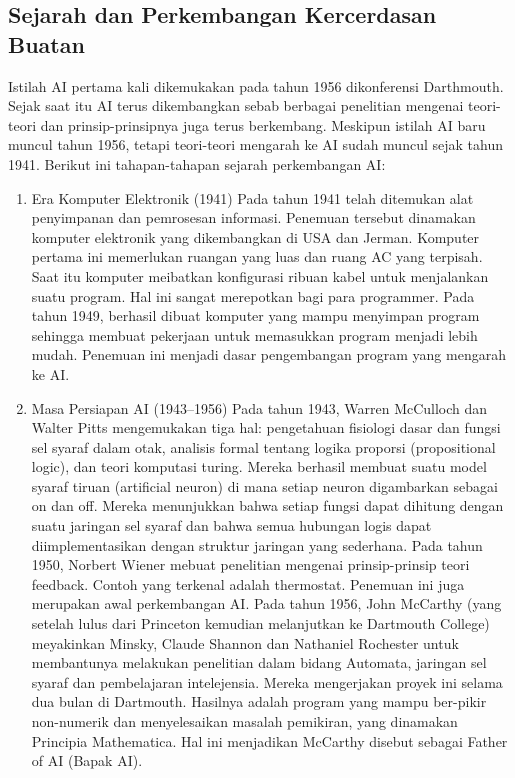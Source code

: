 \subsection{Sejarah dan Perkembangan Kercerdasan Buatan}
\hfill\break
Istilah AI pertama kali dikemukakan pada tahun 1956 dikonferensi Darthmouth. Sejak saat itu AI terus dikembangkan sebab berbagai penelitian mengenai teori-teori dan prinsip-prinsipnya juga terus berkembang. Meskipun istilah AI baru muncul tahun 1956, tetapi teori-teori mengarah ke AI sudah muncul sejak tahun 1941. Berikut ini tahapan-tahapan sejarah perkembangan AI:
\begin{enumerate}
	\item Era Komputer Elektronik (1941)
	\hfill\break
	Pada tahun 1941 telah ditemukan alat penyimpanan dan pemrosesan informasi. Penemuan tersebut dinamakan komputer elektronik yang dikembangkan di USA dan Jerman. Komputer pertama ini memerlukan ruangan yang luas dan ruang AC yang terpisah. Saat itu komputer meibatkan konfigurasi ribuan kabel untuk menjalankan suatu program. Hal ini sangat merepotkan bagi para programmer. Pada tahun 1949, berhasil dibuat komputer yang mampu menyimpan program sehingga membuat pekerjaan untuk memasukkan program menjadi lebih mudah. Penemuan ini menjadi dasar pengembangan program yang mengarah ke AI.

	\item Masa Persiapan AI (1943–1956)
	\hfill\break
	Pada tahun 1943, Warren McCulloch dan Walter Pitts mengemukakan tiga hal: pengetahuan fisiologi dasar dan fungsi sel syaraf dalam otak, analisis formal tentang logika proporsi (propositional logic), dan teori komputasi turing. Mereka berhasil membuat suatu model syaraf tiruan (artificial neuron) di mana setiap neuron digambarkan sebagai on dan off. Mereka menunjukkan bahwa setiap fungsi dapat dihitung dengan suatu jaringan sel syaraf dan bahwa semua hubungan logis dapat diimplementasikan dengan struktur jaringan yang sederhana.
	\noindent
	Pada tahun 1950, Norbert Wiener mebuat penelitian mengenai prinsip-prinsip teori feedback. Contoh yang terkenal adalah thermostat. Penemuan ini juga merupakan awal perkembangan AI. Pada tahun 1956, John McCarthy (yang setelah lulus dari Princeton kemudian melanjutkan ke Dartmouth College) meyakinkan Minsky, Claude Shannon dan Nathaniel Rochester untuk membantunya melakukan penelitian dalam bidang Automata, jaringan sel syaraf dan pembelajaran intelejensia. Mereka mengerjakan proyek ini selama dua bulan di Dartmouth. Hasilnya adalah program yang mampu ber-pikir non-numerik dan menyelesaikan masalah pemikiran, yang dinamakan Principia Mathematica. Hal ini menjadikan McCarthy disebut sebagai Father of AI (Bapak AI).


\end{enumerate}

